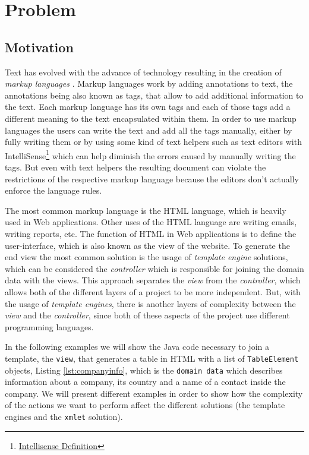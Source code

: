 \chapter{Problem}
\label{cha:problem}

\sloppy

\section{Motivation}
\label{sec:motivation}

Text has evolved with the advance of technology resulting in the creation of \textit{markup languages} \cite{markuplanguages}. Markup languages work by adding annotations to text, the annotations being also known as tags, that allow to add additional information to the text. Each markup language has its own tags and each of those tags add a different meaning to the text encapsulated within them. In order to use markup languages the users can write the text and add all the tags manually, either by fully writing them or by using some kind of text helpers such as text editors with IntelliSense\footnote{\href{https://www.techopedia.com/definition/24580/intellisense}{Intellisense Definition}} which can help diminish the errors caused by manually writing the tags. But even with text helpers the resulting document can violate the restrictions of the respective markup language because the editors don't actually enforce the language rules. 

\noindent
The most common markup language is the \ac{HTML} language, which is heavily used in Web applications. Other uses of the \ac{HTML} language are writing emails, writing reports, etc. The function of \ac{HTML} in Web applications is to define the user-interface, which is also known as the view of the website. To generate the end view the most common solution is the usage of \textit{template engine}  solutions, which can be considered the \textit{controller} which is responsible for joining the domain data with the views. This approach separates the \textit{view} from the \textit{controller}, which allows both of the different layers of a project to be more independent. But, with the usage of \textit{template engines}, there is another layers of complexity between the \textit{view} and the \textit{controller}, since both of these aspects of the project use different programming languages. 

\noindent
In the following examples we will show the Java code necessary to join a template, the \texttt{view}, that generates a table in \ac{HTML} with a list of  \texttt{TableElement} objects, Listing \ref{lst:companyinfo}, which is the \texttt{domain data} which describes information about a company, its country and a name of a contact inside the company. We will present different examples in order to show how the complexity of the actions we want to perform affect the different solutions (the template engines and the \texttt{xmlet} solution).

